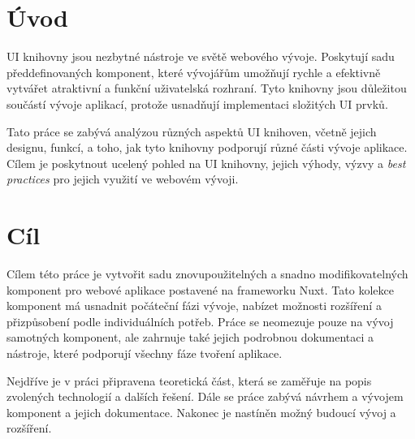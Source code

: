 
\chapter{Úvod}
UI knihovny jsou nezbytné nástroje ve světě webového vývoje. Poskytují sadu předdefinovaných komponent, které vývojářům umožňují rychle
a efektivně vytvářet atraktivní a funkční uživatelská rozhraní. Tyto knihovny jsou důležitou součástí vývoje aplikací, protože
usnadňují implementaci složitých UI prvků.

Tato práce se zabývá analýzou různých aspektů UI knihoven, včetně jejich designu, funkcí, a toho, jak tyto knihovny podporují různé části
vývoje aplikace. Cílem je poskytnout ucelený pohled na UI knihovny, jejich výhody, výzvy a \emph{best practices} pro jejich využití ve webovém vývoji.


\chapter{Cíl}
Cílem této práce je vytvořit sadu znovupoužitelných a snadno modifikovatelných komponent pro webové aplikace postavené na frameworku Nuxt.
Tato kolekce komponent má usnadnit počáteční fázi vývoje, nabízet možnosti rozšíření a přizpůsobení podle individuálních potřeb.
Práce se neomezuje pouze na vývoj samotných komponent, ale zahrnuje také jejich podrobnou dokumentaci a nástroje, které podporují všechny fáze
tvoření aplikace.

Nejdříve je v práci připravena teoretická část, která se zaměřuje na popis zvolených technologií a dalších řešení. Dále se práce zabývá návrhem 
a vývojem komponent a jejich dokumentace. Nakonec je nastíněn možný budoucí vývoj a rozšíření.
